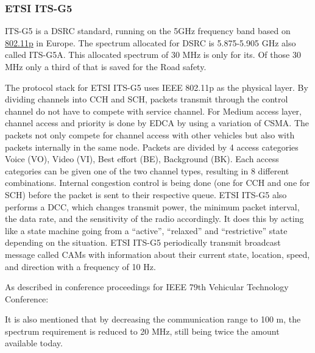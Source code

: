 \subsubsection{ETSI ITS-G5}\label{sec:ITS-G5}
ITS-G5 is a \acrfull{DSRC} standard, running on the 5GHz frequency band based on \hyperref[sec:802.11p]{802.11p} in Europe.
The spectrum allocated for DSRC is 5.875-5.905 GHz also called ITS-G5A. This allocated spectrum of 30 MHz is only for \acrshort{its}. Of those 30 MHz only a third of that is saved for the Road safety.\par
% 
The protocol stack for \acrshort{ETSI} ITS-G5 uses \acrshort{IEEE} 802.11p as the physical layer. By dividing channels into \acrfull{CCH} and \acrfull{SCH}, packets transmit through the control channel do not have to compete with service channel. For Medium access layer, channel access and priority is done by \acrfull{EDCA} by using a variation of \acrshort{CSMA}. The packets not only compete for channel access with other vehicles but also with packets internally in the same node. Packets are divided by 4 access categories Voice (VO), Video (VI), Best effort (BE), Background (BK). Each access categories can be given one of the two channel types, resulting in 8 different combinations. Internal congestion control is being done (one for \acrshort{CCH} and one for \acrshort{SCH}) before the packet is sent to their respective queue. \acrshort{ETSI} ITS-G5 also performs a \acrfull{DCC}, which changes transmit power, the minimum packet interval, the data rate, and the sensitivity of the radio accordingly. It does this by acting like a state machine going from a “active”, “relaxed” and “restrictive” state depending on the situation.
\acrshort{ETSI} ITS-G5 periodically transmit broadcast message called CAMs with information about their current state, location, speed, and direction with a frequency of 10 Hz.\par
% 
As described in conference proceedings for IEEE 79th Vehicular Technology Conference: \par 
% 
It is also mentioned that by decreasing the communication range to 100 m, the spectrum requirement is reduced to 20 MHz, still being twice the amount available today. 